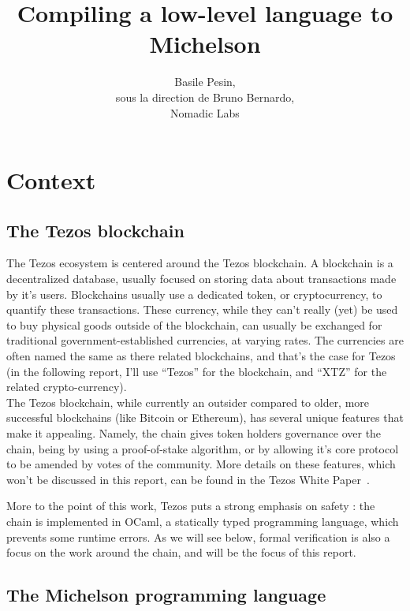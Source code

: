 \documentclass{report}
\title{Compiling a low-level language to Michelson}
\author{Basile Pesin,\\
  sous la direction de Bruno Bernardo,\\
  Nomadic Labs}
\begin{document}
\maketitle


\chapter*{Context}

\section{The Tezos blockchain}

The Tezos ecosystem is centered around the Tezos blockchain. A blockchain is a decentralized database, usually focused on storing data about transactions made by it's users. Blockchains usually use a dedicated token, or cryptocurrency, to quantify these transactions. These currency, while they can't really (yet) be used to buy physical goods outside of the blockchain, can usually be exchanged for traditional government-established currencies, at varying rates. The currencies are often named the same as there related blockchains, and that's the case for Tezos (in the following report, I'll use ``Tezos'' for the blockchain, and ``XTZ'' for the related crypto-currency).\\

The Tezos blockchain, while currently an outsider compared to older, more successful blockchains (like Bitcoin or Ethereum), has several unique features that make it appealing. Namely, the chain gives token holders governance over the chain, being by using a proof-of-stake algorithm, or by allowing it's core protocol to be amended by votes of the community. More details on these features, which won't be discussed in this report, can be found in the Tezos White Paper~\cite{whitePaper}.

More to the point of this work, Tezos puts a strong emphasis on safety : the chain is implemented in OCaml, a statically typed programming language, which prevents some runtime errors. As we will see below, formal verification is also a focus on the work around the chain, and will be the focus of this report.

\section{The Michelson programming language}
\end{document}
